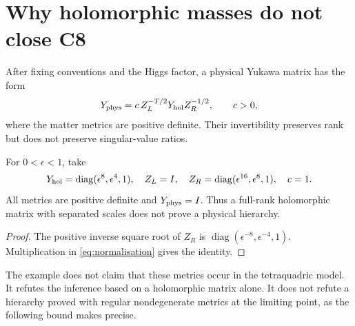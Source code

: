 \section{Why holomorphic masses do not close C8}
After fixing conventions and the Higgs factor, a physical Yukawa matrix
has the form
\begin{equation}\label{eq:normalisation}
 Y_{\rm phys}=c\,Z_L^{-T/2}Y_{\rm hol}Z_R^{-1/2},
 \qquad c>0,
\end{equation}
where the matter metrics are positive definite. Their invertibility
preserves rank but does not preserve singular-value ratios.

\begin{proposition}\label{prop:normalisation}
For $0<\epsilon<1$, take
\[
Y_{\rm hol}=\operatorname{diag}(\epsilon^8,\epsilon^4,1),\quad
Z_L=I,\quad Z_R=\operatorname{diag}(\epsilon^{16},\epsilon^8,1),\quad c=1.
\]
All metrics are positive definite and $Y_{\rm phys}=I$. Thus a full-rank
holomorphic matrix with separated scales does not prove a physical hierarchy.
\end{proposition}
\begin{proof}
The positive inverse square root of $Z_R$ is
$\operatorname{diag}(\epsilon^{-8},\epsilon^{-4},1)$. Multiplication in
\eqref{eq:normalisation} gives the identity.
\end{proof}
The example does not claim that these metrics occur in the tetraquadric
model. It refutes the inference based on a holomorphic matrix alone.
It does not refute a hierarchy proved with regular nondegenerate metrics
at the limiting point, as the following bound makes precise.

